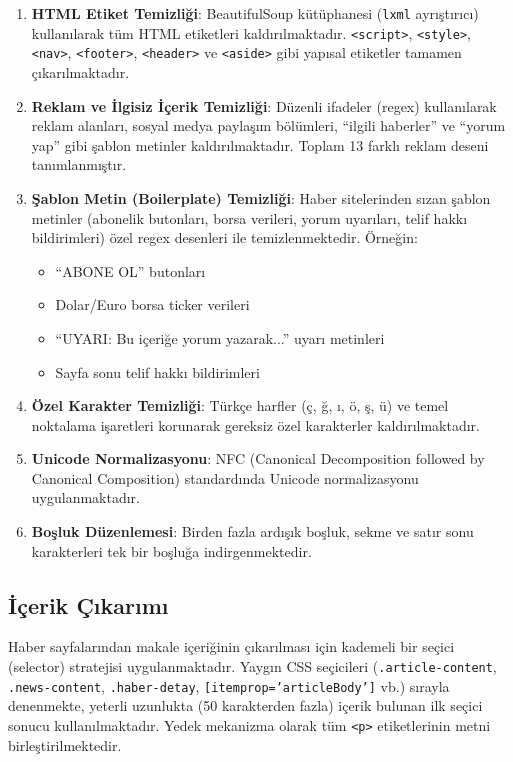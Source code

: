 \documentclass[conference]{IEEEtran}
\begin{document}
\begin{enumerate}
    \item \textbf{HTML Etiket Temizliği}: BeautifulSoup kütüphanesi (\texttt{lxml} ayrıştırıcı) kullanılarak tüm HTML etiketleri kaldırılmaktadır. \texttt{<script>}, \texttt{<style>}, \texttt{<nav>}, \texttt{<footer>}, \texttt{<header>} ve \texttt{<aside>} gibi yapısal etiketler tamamen çıkarılmaktadır.

    \item \textbf{Reklam ve İlgisiz İçerik Temizliği}: Düzenli ifadeler (regex) kullanılarak reklam alanları, sosyal medya paylaşım bölümleri, ``ilgili haberler'' ve ``yorum yap'' gibi şablon metinler kaldırılmaktadır. Toplam 13 farklı reklam deseni tanımlanmıştır.

    \item \textbf{Şablon Metin (Boilerplate) Temizliği}: Haber sitelerinden sızan şablon metinler (abonelik butonları, borsa verileri, yorum uyarıları, telif hakkı bildirimleri) özel regex desenleri ile temizlenmektedir. Örneğin:
    \begin{itemize}
        \item ``ABONE OL'' butonları
        \item Dolar/Euro borsa ticker verileri
        \item ``UYARI: Bu içeriğe yorum yazarak...'' uyarı metinleri
        \item Sayfa sonu telif hakkı bildirimleri
    \end{itemize}

    \item \textbf{Özel Karakter Temizliği}: Türkçe harfler (ç, ğ, ı, ö, ş, ü) ve temel noktalama işaretleri korunarak gereksiz özel karakterler kaldırılmaktadır.

    \item \textbf{Unicode Normalizasyonu}: NFC (Canonical Decomposition followed by Canonical Composition) standardında Unicode normalizasyonu uygulanmaktadır.

    \item \textbf{Boşluk Düzenlemesi}: Birden fazla ardışık boşluk, sekme ve satır sonu karakterleri tek bir boşluğa indirgenmektedir.
\end{enumerate}

\subsection{İçerik Çıkarımı}

Haber sayfalarından makale içeriğinin çıkarılması için kademeli bir seçici (selector) stratejisi uygulanmaktadır. Yaygın CSS seçicileri (\texttt{.article-content}, \texttt{.news-content}, \texttt{.haber-detay}, \texttt{[itemprop='articleBody']} vb.) sırayla denenmekte, yeterli uzunlukta (50 karakterden fazla) içerik bulunan ilk seçici sonucu kullanılmaktadır. Yedek mekanizma olarak tüm \texttt{<p>} etiketlerinin metni birleştirilmektedir.
\end{document}
